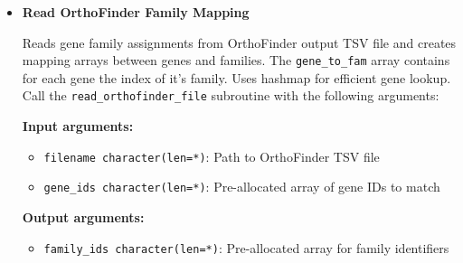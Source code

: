 \documentclass[11pt]{article}
\begin{document}
\begin{enumerate}
\begin{enumerate}
\begin{itemize}
\begin{itemize}
	      	      	      	\item \texttt{delimiter character(len=1), optional}: Column delimiter
	      	      	      	      (default: tab)
	      	      	      \end{itemize}
	      	      	      \textbf{Output arguments:}
	      	      	      \begin{itemize}
	      	      	      	\item \texttt{expression\_vectors real(real64)}: Pre-allocated 2D
	      	      	      	      array for expression data populated with data
	      	      	      	      
	      	      	      	\item \texttt{ierr integer(int32)}: Error code
	      	      	      \end{itemize}
	      	      	      \begin{lstlisting}[language=Fortran, caption={Read Expression Vectors}]
! Pre-allocate arrays
real(real64) :: expr_data(n_samples, n_genes)

! Read TSV file with tab delimiter (default)
call read_expression_vectors(files, gene_ids, expr_data, 1, 1, &
                            value_cols, 1, ierr)

! Read CSV file with comma delimiter
call read_expression_vectors(files, gene_ids, expr_data, 1, 1, &
                            value_cols, 1, ierr, ',')
	      	      	      \end{lstlisting}
	      	      	      
	      	      	\item \textbf{Read OrthoFinder Family Mapping}
	      	      	      
	      	      	      Reads gene family assignments from OrthoFinder output TSV file and
	      	      	      creates mapping arrays between genes and families. The \texttt{gene\_to\_fam}
	      	      	      array contains for each gene the index of it's family. Uses
	      	      	      hashmap for efficient gene lookup. Call the \texttt{read\_orthofinder\_file}
	      	      	      subroutine with the following arguments:
	      	      	      
	      	      	      \textbf{Input arguments:}
	      	      	      \begin{itemize}
	      	      	      	\item \texttt{filename character(len=*)}: Path to OrthoFinder TSV
	      	      	      	      file
	      	      	      	      
	      	      	      	\item \texttt{gene\_ids character(len=*)}: Pre-allocated array of
	      	      	      	      gene IDs to match
	      	      	      \end{itemize}
	      	      	      \textbf{Output arguments:}
	      	      	      \begin{itemize}
	      	      	      	\item \texttt{family\_ids character(len=*)}: Pre-allocated array
	      	      	      	      for family identifiers
	      	      	      	      

\end{itemize}
\end{itemize}
\end{enumerate}
\end{enumerate}
\end{document}
